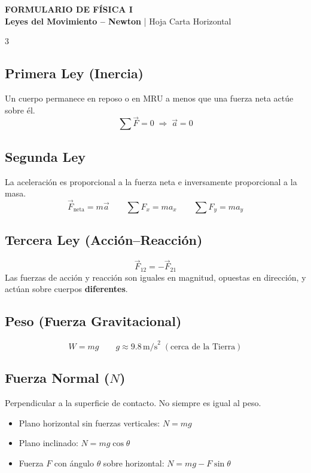 \documentclass[10pt,landscape]{article}
\begin{document}
\pagecolor{white}

\begin{center}
{\Huge\bfseries\color{primary} FORMULARIO DE F\'{I}SICA I}\\[2pt]
{\large\color{darkbg}\textbf{Leyes del Movimiento -- Newton} | Hoja Carta Horizontal}
\end{center}
\vspace{-4pt}

\begin{multicols}{3}



\subsection*{Primera Ley (Inercia)}
Un cuerpo permanece en reposo o en MRU a menos que una fuerza neta act\'{u}e sobre \'{e}l.
\[
\sum \vec{F} = 0 \;\Rightarrow\; \vec{a} = 0
\]

\subsection*{Segunda Ley}
La aceleraci\'{o}n es proporcional a la fuerza neta e inversamente proporcional a la masa.
\[
\boxed{\vec{F}_{\text{neta}} = m\vec{a}} \qquad \boxed{\sum F_x = ma_x} \qquad \boxed{\sum F_y = ma_y}
\]

\subsection*{Tercera Ley (Acci\'{o}n--Reacci\'{o}n)}
\[
\vec{F}_{12} = -\vec{F}_{21}
\]
Las fuerzas de acci\'{o}n y reacci\'{o}n son iguales en magnitud, opuestas en direcci\'{o}n, y act\'{u}an sobre cuerpos \textbf{diferentes}.

\vspace{4pt}

\subsection*{Peso (Fuerza Gravitacional)}
\[
\boxed{W = mg} \qquad g \approx 9.8\,\text{m/s}^2 \;(\text{cerca de la Tierra})
\]

\subsection*{Fuerza Normal ($N$)}
Perpendicular a la superficie de contacto. No siempre es igual al peso.
\begin{itemize}[leftmargin=*,nosep,topsep=0pt]
  \item Plano horizontal sin fuerzas verticales: $N = mg$
  \item Plano inclinado: $N = mg\cos\theta$
  \item Fuerza $F$ con \'{a}ngulo $\theta$ sobre horizontal: $N = mg - F\sin\theta$
\end{itemize}


\end{multicols}
\end{document}
